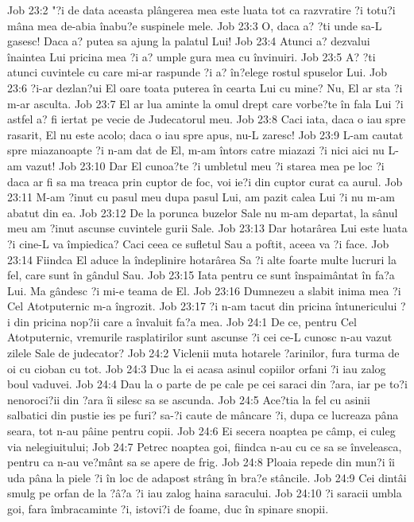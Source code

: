 Job 23:2  "?i de data aceasta plângerea mea este luata tot ca razvratire ?i totu?i mâna mea de-abia înabu?e suspinele mele.
Job 23:3  O, daca a? ?ti unde sa-L gasesc! Daca a? putea sa ajung la palatul Lui!
Job 23:4  Atunci a? dezvalui înaintea Lui pricina mea ?i a? umple gura mea cu învinuiri.
Job 23:5  A? ?ti atunci cuvintele cu care mi-ar raspunde ?i a? în?elege rostul spuselor Lui.
Job 23:6  ?i-ar dezlan?ui El oare toata puterea în cearta Lui cu mine? Nu, El ar sta ?i m-ar asculta.
Job 23:7  El ar lua aminte la omul drept care vorbe?te în fala Lui ?i astfel a? fi iertat pe vecie de Judecatorul meu.
Job 23:8  Caci iata, daca o iau spre rasarit, El nu este acolo; daca o iau spre apus, nu-L zaresc!
Job 23:9  L-am cautat spre miazanoapte ?i n-am dat de El, m-am întors catre miazazi ?i nici aici nu L-am vazut!
Job 23:10  Dar El cunoa?te ?i umbletul meu ?i starea mea pe loc ?i daca ar fi sa ma treaca prin cuptor de foc, voi ie?i din cuptor curat ca aurul.
Job 23:11  M-am ?inut cu pasul meu dupa pasul Lui, am pazit calea Lui ?i nu m-am abatut din ea.
Job 23:12  De la porunca buzelor Sale nu m-am departat, la sânul meu am ?inut ascunse cuvintele gurii Sale.
Job 23:13  Dar hotarârea Lui este luata ?i cine-L va împiedica? Caci ceea ce sufletul Sau a poftit, aceea va ?i face.
Job 23:14  Fiindca El aduce la îndeplinire hotarârea Sa ?i alte foarte multe lucruri la fel, care sunt în gândul Sau.
Job 23:15  Iata pentru ce sunt înspaimântat în fa?a Lui. Ma gândesc ?i mi-e teama de El.
Job 23:16  Dumnezeu a slabit inima mea ?i Cel Atotputernic m-a îngrozit.
Job 23:17  ?i n-am tacut din pricina întunericului ?i din pricina nop?ii care a învaluit fa?a mea.
Job 24:1  De ce, pentru Cel Atotputernic, vremurile rasplatirilor sunt ascunse ?i cei ce-L cunosc n-au vazut zilele Sale de judecator?
Job 24:2  Viclenii muta hotarele ?arinilor, fura turma de oi cu cioban cu tot.
Job 24:3  Duc la ei acasa asinul copiilor orfani ?i iau zalog boul vaduvei.
Job 24:4  Dau la o parte de pe cale pe cei saraci din ?ara, iar pe to?i nenoroci?ii din ?ara îi silesc sa se ascunda.
Job 24:5  Ace?tia la fel cu asinii salbatici din pustie ies pe furi? sa-?i caute de mâncare ?i, dupa ce lucreaza pâna seara, tot n-au pâine pentru copii.
Job 24:6  Ei secera noaptea pe câmp, ei culeg via nelegiuitului;
Job 24:7  Petrec noaptea goi, fiindca n-au cu ce sa se înveleasca, pentru ca n-au ve?mânt sa se apere de frig.
Job 24:8  Ploaia repede din mun?i îi uda pâna la piele ?i în loc de adapost strâng în bra?e stâncile.
Job 24:9  Cei dintâi smulg pe orfan de la ?â?a ?i iau zalog haina saracului.
Job 24:10  ?i saracii umbla goi, fara îmbracaminte ?i, istovi?i de foame, duc în spinare snopii.
